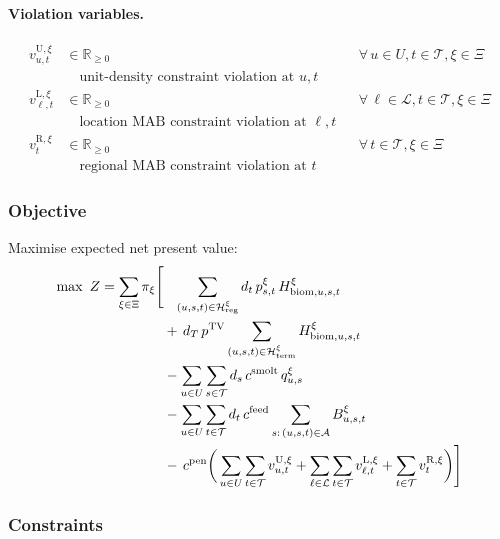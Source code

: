 \documentclass[12pt,a4paper]{article}
\begin{document}
\paragraph{Violation variables.}
\begin{align*}
  v^{\mathrm{U},\xi}_{u,t} &\in \mathbb{R}_{\geq 0} && \forall\, u \in U, t \in \mathcal{T}, \xi \in \Xi \\
    &\quad \text{unit-density constraint violation at } u, t \\
  v^{\mathrm{L},\xi}_{\ell,t} &\in \mathbb{R}_{\geq 0} && \forall\, \ell \in \mathcal{L}, t \in \mathcal{T}, \xi \in \Xi \\
    &\quad \text{location MAB constraint violation at } \ell, t \\
  v^{\mathrm{R},\xi}_{t} &\in \mathbb{R}_{\geq 0} && \forall\, t \in \mathcal{T}, \xi \in \Xi \\
    &\quad \text{regional MAB constraint violation at } t
\end{align*}
 
\subsubsection{Objective}
Maximise expected net present value:
\begin{align}
  \max\ Z = \sum_{\xi \in \Xi} \pi_\xi \Bigg[
    &\phantom{+}\sum_{(u,s,t)\in \mathcal{H}^\xi_{\mathrm{reg}}} d_t\, p^\xi_{s,t}\, H^{\xi}_{\mathrm{biom},u,s,t} \notag\\
    &+\, d_T\, p^{\mathrm{TV}} \sum_{(u,s,t)\in \mathcal{H}^\xi_{\mathrm{term}}} H^{\xi}_{\mathrm{biom},u,s,t} \notag\\
    &-\sum_{u \in U}\sum_{s \in \mathcal{T}} d_s\, c^{\mathrm{smolt}}\, q^\xi_{u,s} \notag\\
    &-\sum_{u \in U}\sum_{t \in \mathcal{T}} d_t\, c^{\mathrm{feed}}
      \sum_{s:\,(u,s,t)\in\mathcal{A}} B^\xi_{u,s,t} \notag \\
    &-\, c^{\mathrm{pen}}\bigg(\sum_{u \in U} \sum_{t \in \mathcal{T}} v^{\mathrm{U},\xi}_{u,t} + \sum_{\ell \in \mathcal{L}} \sum_{t \in \mathcal{T}} v^{\mathrm{L},\xi}_{\ell,t} + \sum_{t \in \mathcal{T}} v^{\mathrm{R},\xi}_{t} \bigg) \Bigg]
  \label{eq:obj}
\end{align}
 
\medskip
\subsubsection{Constraints}
 
\end{document}
